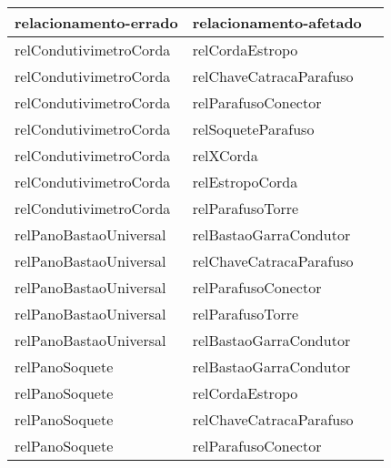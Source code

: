 \begin{table}[H]
\centering
{}
\begin{tabular}{|l|l|l|}
\hline
\textbf{relacionamento-errado}                  & \textbf{relacionamento-afetado}                   \\ \hline
relCondutivimetroCorda                          & relCordaEstropo                                  \\ \hline
relCondutivimetroCorda                          & relChaveCatracaParafuso                          \\ \hline
relCondutivimetroCorda                          & relParafusoConector                              \\ \hline
relCondutivimetroCorda                          & relSoqueteParafuso                               \\ \hline
relCondutivimetroCorda                          & relXCorda                                        \\ \hline
relCondutivimetroCorda                          & relEstropoCorda                                  \\ \hline
relCondutivimetroCorda                          & relParafusoTorre                                 \\ \hline
relPanoBastaoUniversal                          & relBastaoGarraCondutor                           \\ \hline
relPanoBastaoUniversal                          & relChaveCatracaParafuso                          \\ \hline
relPanoBastaoUniversal                          & relParafusoConector                              \\ \hline
relPanoBastaoUniversal                          & relParafusoTorre                                 \\ \hline
relPanoBastaoUniversal                          & relBastaoGarraCondutor                           \\ \hline
relPanoSoquete                                  & relBastaoGarraCondutor                           \\ \hline
relPanoSoquete                                  & relCordaEstropo                                  \\ \hline
relPanoSoquete                                  & relChaveCatracaParafuso                          \\ \hline
relPanoSoquete                                  & relParafusoConector                              \\ \hline

\end{tabular}
\end{table}
